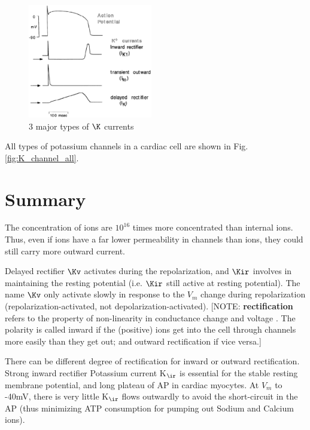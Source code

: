 \begin{figure}[hbt]
  \centerline{\includegraphics[height=5cm,
    angle=0]{./images/K_current_all.eps}}
  \caption{3 major types of $\K$ currents \citep{sanguinetti1997}}
\label{fig:Kcurrent_all}
\end{figure}

All types of potassium channels in a cardiac cell are shown in
Fig.\ref{fig:K_channel_all}.

\section{Summary}
\label{sec:summary-3}


The concentration of  ions are $10^{16}$ times more
concentrated than internal  ions. Thus, even if  ions
have a far lower permeability in  channels than 
ions, they could still carry more outward current.  


Delayed rectifier $\Kv$ activates during the repolarization, and $\Kir$
involves in maintaining the resting potential (i.e.
$\Kir$ still active at resting potential). The name $\Kv$ only activate slowly
in response to the $V_m$ change during repolarization (repolarization-activated,
not depolarization-activated). [NOTE: {\bf rectification}  refers to the
property of non-linearity in conductance change and voltage \citep{hille1992mb}.
The polarity is called inward if the (positive) ions get into the cell through
channels more easily than they get out; and outward rectification if vice
versa.]

\begin{framed}

There can be different degree of rectification for inward or outward
rectification. Strong inward rectifier Potassium current K$_\ir$ is essential
for the stable resting membrane potential, and long plateau of AP in cardiac
myocytes. At $V_m$ to -40mV, there is very little K$_\ir$ flows outwardly to
avoid the short-circuit in the AP (thus minimizing ATP consumption for pumping
out Sodium and Calcium ions)\citep{tanaka1999}.

\end{framed}

